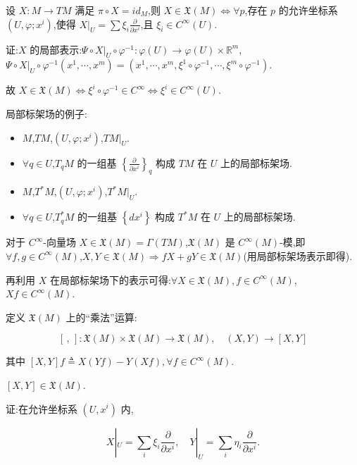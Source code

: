 \begin{proposition}
设 $X : M \to TM$ 满足 $\pi \circ X = id_M$,则 $X \in \mathfrak{X}(M) \iff \forall p$,存在 $p$ 的允许坐标系 $(U, \varphi; x^i)$,使得 $X|_U = \sum \xi_i \frac{\partial}{\partial x^i}$,且 $\xi_i \in C^\infty(U)$.
\end{proposition}

证:$X$ 的局部表示:$\Psi \circ X|_U \circ \varphi^{-1} : \varphi(U) \to \varphi(U) \times \mathbb{R}^m$,$\Psi \circ X|_U \circ \varphi^{-1}(x^1, \cdots, x^m) = (x^1, \cdots, x^m, \xi^1 \circ \varphi^{-1}, \cdots, \xi^m \circ \varphi^{-1})$.

故 $X \in \mathfrak{X}(M) \iff \xi^i \circ \varphi^{-1} \in C^\infty \iff \xi^i \in C^\infty(U)$.

局部标架场的例子:
\begin{itemize}
    \item $M$,$TM$,$(U, \varphi; x^i)$,$TM|_U$.
    \item $\forall q \in U$,$T_qM$ 的一组基 $\left\{ \frac{\partial}{\partial x^i} \right\}_q$ 构成 $TM$ 在 $U$ 上的局部标架场.
    \item $M$,$T^*M$,$(U, \varphi; x^i)$,$T^*M|_U$.
    \item $\forall q \in U$,$T_q^*M$ 的一组基 $\left\{ dx^i \right\}$ 构成 $T^*M$ 在 $U$ 上的局部标架场.
\end{itemize}

对于 $C^\infty$-向量场 $X \in \mathfrak{X}(M) = \Gamma(TM)$,$\mathfrak{X}(M)$ 是 $C^\infty(M)$-模,即 $\forall f, g \in C^\infty(M)$,$X, Y \in \mathfrak{X}(M) \Rightarrow fX + gY \in \mathfrak{X}(M)$(用局部标架场表示即得).

再利用 $X$ 在局部标架场下的表示可得:$\forall X \in \mathfrak{X}(M), f \in C^\infty(M)$,$Xf \in C^\infty(M)$.

定义 $\mathfrak{X}(M)$ 上的“乘法”运算:

\[
[\, , \,] : \mathfrak{X}(M) \times \mathfrak{X}(M) \to \mathfrak{X}(M), \quad (X, Y) \to [X, Y]
\]

其中 $[X, Y]f \triangleq X(Yf) - Y(Xf), \forall f \in C^\infty(M)$.

\begin{proposition}
$[X, Y] \in \mathfrak{X}(M)$.
\end{proposition}

证:在允许坐标系 $(U, x^i)$ 内,

\[
X|_U = \sum_i \xi_i \frac{\partial}{\partial x^i}, \quad Y|_U = \sum_i \eta_i \frac{\partial}{\partial x^i}.
\]

